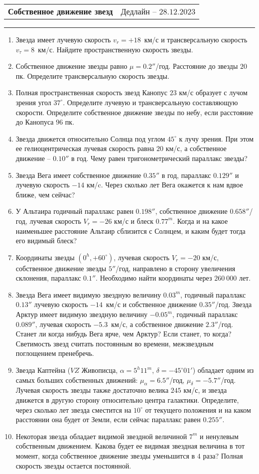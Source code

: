 \documentclass[12pt]{article}
\begin{document}
 \begin{tabularx}{\textwidth}{Xr}
  {\Large \textbf{Собственное движение звезд}} & Дедлайн -- $28.12.2023$ \\
 \end{tabularx}
 \noindent\rule{\textwidth}{0.4pt}
 \begin{enumerate}
        \item Звезда имеет лучевую скорость $v_r=+18$~км/с и трансверсальную скорость $v_{\tau}=8$~км/с. Найдите пространственную скорость звезды.
        \item Собственное движение звезды равно $\mu=0.2''$/год. Расстояние до звезды $20$ пк. Определите трансверсальную скорость звезды.
        \item Полная пространственная скорость звезд Канопус $23$ км/с образует с лучом зрения угол $37^{\circ}$. Определите лучевую и трансверсальную составляющую скорости. Определите собственное движение звезды по небу, если расстояние до Канопуса  $96$ пк.
        \item Звезда движется относительно Солнца под углом $45^{\circ}$ к лучу зрения. При этом ее гелиоцентрическая лучевая скорость равна $20$ км/с, а собственное движение -- $0.10''$ в год. Чему равен тригонометрический параллакс звезды?
        \item Звезда Вега имеет собственное движение $0.35''$ в год, параллакс $0.129''$ и лучевую скорость $-14$ км/c. Через сколько лет Вега окажется к нам вдвое ближе, чем сейчас?
        \item У Альтаира годичный параллакс равен $0.198''$, собственное движение $0.658''$/год, лучевая скорость $V_r =- 26$ км/с и блеск $0.77^m$. Когда и на какое наименьшее расстояние Альтаир сблизится с Солнцем, и каким будет тогда его видимый блеск?
        \item Координаты звезды $(0^h, +60^{\circ})$, лучевая скорость $V_r=-20$ км/с, собственное движение звезды $5''$/год, направлено в сторону увеличения склонения, параллакс $0.1''$. Необходимо найти координаты через $260~000$ лет.
        \item Звезда Вега имеет видимую звездную величину $0.03^m$, годичный параллакс $0.13''$ лучевую скорость $-14$~км/с и собственное движение $0.35''$/год. Звезда Арктур имеет видимую звездную величину $-0.05^m$, годичный параллакс $0.089''$, лучевая скорость $-5.3$~км/с, а собственное движение $2.3''$/год. Станет ли когда нибудь Вега ярче, чем Арктур?  Если станет, то когда? Светимость звезд считать постоянным во времени, межзвездным поглощением пренебречь.
        \item Звезда Каптейна ($VZ$ Живописца, $\alpha=5^h 11^m$, $\delta=-45^{\circ} 01'$) обладает одним из самых больших собственных движений: $\mu_{\alpha}=6.5''$/год, $\mu_{\delta}=-5.7''$/год. Лучевая скорость звезды также достаточно велика $245$ км/с, и звезда движется в другую сторону относительно центра галактики. Определите, через сколько лет звезда сместится на $10^{\circ}$ от текущего положения и на каком расстоянии она будет от Земли, если сейчас параллакс равен $0.255''$.
        \item Некоторая звезда обладает видимой звездной величиной $7^m$ и ненулевым собственным движением. Какова будет ее видимая звездная величина в тот момент, когда собственное движение звезды уменьшится в $4$ раза? Полная скорость звезды остается постоянной.
 \end{enumerate}
\end{document}
